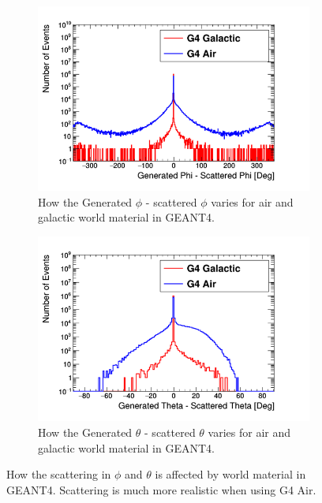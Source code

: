 \begin{figure}[!h]
\centering
\begin{subfigure}{.5\textwidth}
  \centering
  \includegraphics[width=\linewidth]{Chapter4/Figs/Raster/CryPlots/genPhi-scatPhi.png}
  \captionsetup{width=.9\linewidth}
  \caption{How the Generated $\phi$ - scattered $\phi$ varies for air and galactic world material in GEANT4.}
  \label{subFig:genPhi-scatPhi}
\end{subfigure}%
\begin{subfigure}{.5\textwidth}
  \centering
  \includegraphics[width=\linewidth]{Chapter4/Figs/Raster/CryPlots/genTheta-scatTheta.png}
  \captionsetup{width=.9\linewidth}
  \caption{How the Generated $\theta$ - scattered $\theta$ varies for air and galactic world material in GEANT4.}
  \label{subFig:genTheta-scatPhi}
\end{subfigure}
\caption{How the scattering in $\phi$ and $\theta$ is affected by world material in GEANT4. Scattering is much more realistic when using G4 Air.}
\label{fig:gen-scat_PhiTheta}
\end{figure}

